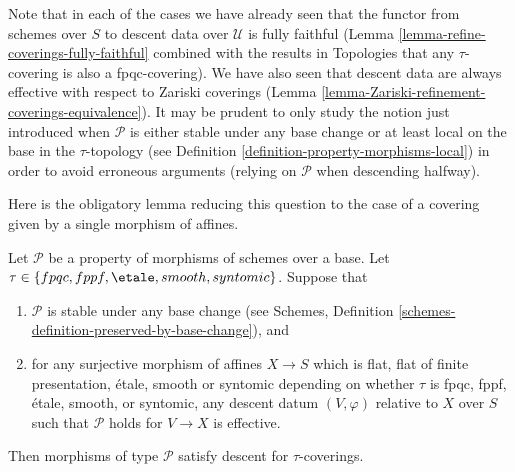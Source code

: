 \noindent
Note that in each of the cases we have already seen that
the functor from schemes over $S$ to descent data over
$\mathcal{U}$ is fully faithful
(Lemma \ref{lemma-refine-coverings-fully-faithful} combined
with the results in Topologies that any $\tau$-covering
is also a fpqc-covering).
We have also seen that descent data are always effective with
respect to Zariski coverings
(Lemma \ref{lemma-Zariski-refinement-coverings-equivalence}).
It may be prudent to only study the notion just introduced
when $\mathcal{P}$ is either stable under any base change or at least
local on the base in the $\tau$-topology
(see Definition \ref{definition-property-morphisms-local})
in order to avoid erroneous arguments (relying on $\mathcal{P}$
when descending halfway).

\medskip\noindent
Here is the obligatory lemma reducing this question
to the case of a covering given by a single morphism of affines.

\begin{lemma}
\label{lemma-descending-types-morphisms}
Let $\mathcal{P}$ be a property of morphisms of schemes over a base.
Let $\tau \in \{fpqc, fppf, \etale, smooth, syntomic\}$.
Suppose that
\begin{enumerate}
\item $\mathcal{P}$ is stable under any base change
(see Schemes, Definition \ref{schemes-definition-preserved-by-base-change}),
and
\item for any surjective morphism of affines
$X \to S$ which is flat, flat of finite presentation,
\'etale, smooth or syntomic depending on whether $\tau$ is
fpqc, fppf, \'etale, smooth, or syntomic,
any descent datum $(V, \varphi)$ relative
to $X$ over $S$ such that $\mathcal{P}$ holds for
$V \to X$ is effective.
\end{enumerate}
Then morphisms of type $\mathcal{P}$ satisfy descent for $\tau$-coverings.
\end{lemma}

